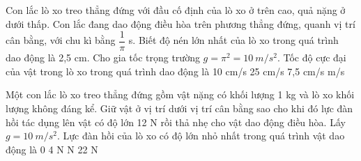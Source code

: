 \begin{ex}%
Con lắc lò xo treo thẳng đứng với đầu cố định của lò xo ở trên cao, quả nặng ở dưới thấp. Con lắc đang dao động điều hòa trên phương thẳng đứng, quanh vị trí cân bằng, với chu kì bằng $\dfrac{1}{\pi}$ s. Biết độ nén lớn nhất của lò xo trong quá trình dao động là 2,5 cm. Cho gia tốc trọng trường $g = \pi^2 = 10\ m/s^2$. Tốc độ cực đại của vật trong lò xo trong quá trình dao động là
\choice
{10 cm/s}
{25 cm/s}
{7,5 cm/s}
{ m/s}
\end{ex} 





























\begin{ex}%
Một con lắc lò xo treo thẳng đứng gồm vật nặng có khối lượng 1 kg và lò xo khối lượng không đáng kể. Giữ vật ở vị trí dưới vị trí cân bằng sao cho khi đó lực đàn hồi tác dụng lên vật có độ lớn 12 N rồi thả nhẹ cho vật dao động điều hòa. Lấy $g = 10\ m/s^2$. Lực đàn hồi của lò xo có độ lớn nhỏ nhất trong quá trình vật dao động là
\choice
{0}
{4 N}
{ N}
{22 N}
\end{ex} 


